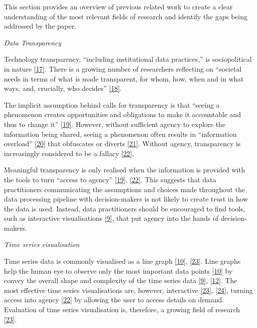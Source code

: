 \documentclass{article}
\begin{document}
\label{sec:headings}

This section provides an overview of previous related work to create a
clear understanding of the most relevant fields of research and identify
the gaps being addressed by the paper.

\emph{Data Transparency}

Technology transparency, ``including institutional data practices,'' is
sociopolitical in nature
\protect\hyperlink{ref-political_transparency}{{[}17{]}}. There is a
growing number of researchers reflecting on ``societal needs in terms of
what is made transparent, for whom, how, when and in what ways, and,
crucially, who decides''
\protect\hyperlink{ref-social_transparency}{{[}18{]}}.

The implicit assumption behind calls for transparency is that ``seeing a
phenomenon creates opportunities and obligations to make it accountable
and thus to change it''
\protect\hyperlink{ref-transparency_lack}{{[}19{]}}. However, without
sufficient agency to explore the information being shared, seeing a
phenomenon often results in ``information overload''
\protect\hyperlink{ref-digital_transparency}{{[}20{]}} that obfuscates
or diverts \protect\hyperlink{ref-transparency_obfuscation}{{[}21{]}}.
Without agency, transparency is increasingly considered to be a fallacy
\protect\hyperlink{ref-transparency_fallacy}{{[}22{]}}.

Meaningful transparency is only realised when the information is
provided with the tools to turn ``access to agency''
\protect\hyperlink{ref-transparency_lack}{{[}19{]}},
\protect\hyperlink{ref-transparency_fallacy}{{[}22{]}}. This suggests
that data practitioners communicating the assumptions and choices made
throughout the data processing pipeline with decision-makers is not
likely to create trust in how the data is used. Instead, data
practitioners should be encouraged to find tools, such as interactive
visualisations \protect\hyperlink{ref-datapoint}{{[}9{]}}, that put
agency into the hands of decision-makers.

\emph{Time series visualisation}

Time series data is commonly visualised as a line graph
\protect\hyperlink{ref-Sveinn}{{[}10{]}},
\protect\hyperlink{ref-timenotes}{{[}23{]}}. Line graphs help the human
eye to observe only the most important data points
\protect\hyperlink{ref-Sveinn}{{[}10{]}} by convey the overall shape and
complexity of the time series data
\protect\hyperlink{ref-datapoint}{{[}9{]}},
\protect\hyperlink{ref-downsampling}{{[}12{]}}. The most effective time
series visualisations are, however, interactive
\protect\hyperlink{ref-timenotes}{{[}23{]}},
\protect\hyperlink{ref-plotly}{{[}24{]}}, turning access into agency
\protect\hyperlink{ref-transparency_fallacy}{{[}22{]}} by allowing the
user to access details on demand. Evaluation of time series
visualisation is, therefore, a growing field of research
\protect\hyperlink{ref-timenotes}{{[}23{]}}.
\end{document}
